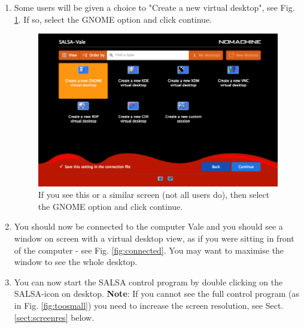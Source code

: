 \begin{enumerate}
{\bf Note:} Here you need to use your ``telescope password'', which may be different
than the password you use to book observing time. Check the SALSA-webpage, under ``My account'' 
to find your telescope password. Also, please remember that you can only connect to a computer 
if you have booked observing time.
\item Some users will be given a choice to "Create a new virtual desktop", see Fig. \ref{fig:virtual}. If so,
	select the GNOME option and click continue.
\begin{figure}[H]
    \centering
    \includegraphics[height=0.5\textwidth]{../figures/nomachinefigs/fig_virtual.png}
	\caption{If you see this or a similar screen (not all users do), then select the GNOME option and click
	continue.}
    \label{fig:virtual}
\end{figure}
\item You should now be connected to the computer Vale and you should see a
	window on screen with a virtual desktop view, as if you were sitting in
	front of the computer - see Fig. \ref{fig:connected}.  You may want to
	maximise the window to see the whole desktop. 
\item You can now start the SALSA control program by double clicking on the SALSA-icon on desktop.
	{\bf Note}: If you cannot see the full control program (as in Fig.
	\ref{fig:toosmall}) you need to increase the screen resolution, see Sect.
	\ref{sect:screenres} below.
\end{enumerate}

